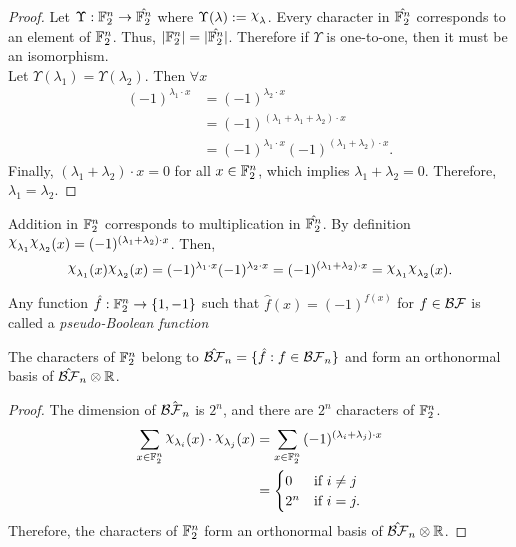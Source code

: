 \begin{proof}
  \par Let $\Upsilon:\mathbb{F}_2^n\rightarrow\hat{\mathbb{F}_2^n}$ where
  $\Upsilon(\lambda):=\Chi_\lambda$.
	Every character in $\hat{\mathbb{F}_2^n}$ corresponds to an element of
  $\mathbb{F}_2^n$. Thus, $\lvert\mathbb{F}_2^n\rvert=\lvert\hat{\mathbb{F}_2^n}\rvert$.
  Therefore if $\Upsilon$ is one-to-one, then it must be an isomorphism.\\
	Let $\Upsilon(\lambda_1)=\Upsilon(\lambda_2)$. Then $\forall x$
	\begin{align*}
		(-1)^{\lambda_1\cdot x}
      &=(-1)^{\lambda_2\cdot x}\\
		  &=(-1)^{(\lambda_1+\lambda_1+\lambda_2)\cdot x}\\
      &=(-1)^{\lambda_1\cdot x}(-1)^{(\lambda_1+\lambda_2)\cdot x}.
	\end{align*}
	Finally, $(\lambda_1+\lambda_2)\cdot x=0$ for all $x\in\mathbb{F}_2^n$, which
  implies $\lambda_1+\lambda_2=0$. Therefore, $\lambda_1=\lambda_2$.
\end{proof}

\par Addition in $\mathbb{F}_2^n$ corresponds to multiplication in
$\hat{\mathbb{F}_2^n}$. By definition
$\Chi_{\lambda_1}\Chi_{\lambda_2}(x)=(-1)^{(\lambda_1+\lambda_2)\cdot x}$.
Then,
\[
\Chi_{\lambda_1}(x)\Chi_{\lambda_2}(x)
  =(-1)^{\lambda_1\cdot x}(-1)^{\lambda_2\cdot x}
  =(-1)^{(\lambda_1+\lambda_2)\cdot x}
  =\Chi_{\lambda_1}\Chi_{\lambda_2}(x).
\]

\begin{definition}\label{def:pBF}
	Any function $\hat{f}:\mathbb{F}_2^n\rightarrow\{1,-1\}$ such that
  $\hat{f}(x)=(-1)^{f(x)}$ for $f\in\mathcal{BF}$ is called a \textit{pseudo-Boolean
  function}
\end{definition}

\begin{lemma}
  The characters of $\mathbb{F}_2^n$ belong to $\hat{\mathcal{BF}}_n
  =\{\hat{f}:f\in\mathcal{BF}_n\}$ and form an orthonormal basis of
  $\hat{\mathcal{BF}}_n\otimes\mathbb{R}$.
\end{lemma}
\begin{proof}
  The dimension of $\hat{\mathcal{BF}_n}$ is $2^n$, and there are $2^n$ characters of
  $\mathbb{F}_2^n$.
  \begin{align*}
    \sum_{x\in\gftwo^n}{\Chi_{\lambda_i}(x)\cdot\Chi_{\lambda_j}(x)}
    &=\sum_{x\in\gftwo^n}
      {(-1)^{(\lambda_i+\lambda_j)\cdot x}}\\
    &=\begin{cases}
      0 & \text{if } i\not=j \\
      2^n & \text{if } i=j.
    \end{cases}
  \end{align*}
  Therefore, the characters of $\mathbb{F}_2^n$ form an orthonormal basis of
  $\hat{\mathcal{BF}}_n\otimes\mathbb{R}$.
\end{proof}

